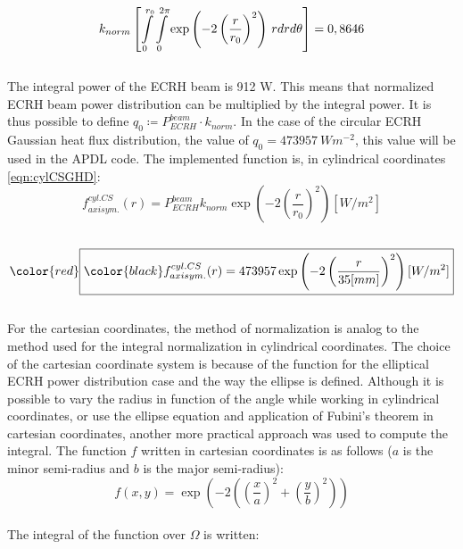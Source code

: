 \\
\begin{equation}
    k_{norm} \left[ \int\displaylimits_0^{r_0} \int\displaylimits_0^{2 \pi} \exp\left(-2\left(\frac{r}{r_0}\right)^2 \right) \,rdrd\theta \right] = 0,8646
\end{equation}
\\
\normalsize{\indent The integral power of the ECRH beam is 912 W. This means that normalized ECRH beam power distribution can be multiplied by the integral power. It is thus possible to define $q_0 \coloneqq P_{ECRH}^{beam} \cdot k_{norm}$. In the case of the circular ECRH Gaussian heat flux distribution, the value of $q_0=473957 \ Wm^{-2}$, this value will be used in the APDL code. The implemented function is, in cylindrical coordinates \eqref{eqn:cylCSGHD}:}
\\
\begin{equation}
    f_{axisym.}^{cyl. CS}(r) = P_{ECRH}^{beam} k_{norm} \exp\left(-2\left(\frac{r}{r_0}\right)^2 \right) [W/m^2]
\end{equation}
\\ 
\begin{equation}
    \color{red}\boxed{\color{black} f_{axisym.}^{cyl. CS}(r) = 473957 \exp\left(-2\left(\frac{r}{35[mm]}\right)^2 \right) [W/m^2]}
    \label{eqn:cylCSGHD}
\end{equation}
\\
\normalsize{\indent For the cartesian coordinates, the method of normalization is analog to the method used for the integral normalization in cylindrical coordinates. The choice of the cartesian coordinate system is because of the function for the elliptical \acrshort{ECRH} power distribution case and the way the ellipse is defined. Although it is possible to vary the radius in function of the angle while working in cylindrical coordinates, or use the ellipse equation and application of Fubini’s theorem in cartesian coordinates, another more practical approach was used to compute the integral. The function $f$ written in cartesian coordinates is as follows ($a$ is the minor semi-radius and $b$ is the major semi-radius):}
\\ 
\begin{equation}
    f(x,y) = \exp\left(-2\left(\left(\frac{x}{a}\right)^2 + \left(\frac{y}{b}\right)^2 \right) \right)
    \label{eqn:carCSGDnn}
\end{equation}
\\
\normalsize{The integral of the function over $\Omega$ is written:}
\\ 
